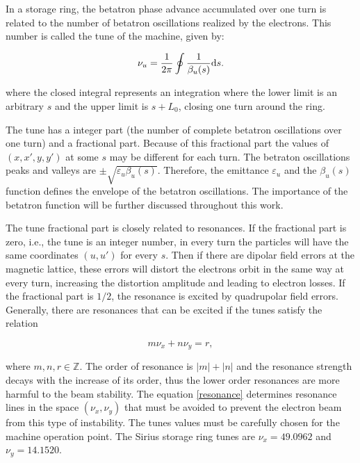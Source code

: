 In a storage ring, the betatron phase advance accumulated over one turn is related to the number of betatron oscillations realized by the electrons. This number is called the tune of the machine, given by:

\begin{equation}
    \nu_u = \dfrac{1}{2\pi} \oint \dfrac{1}{\beta_u({s})} \mathrm{d} {s}.
\end{equation}

where the closed integral represents an integration where the lower limit is an arbitrary $s$ and the upper limit is $s + L_0$, closing one turn around the ring.

The tune has a integer part (the number of complete betatron oscillations over one turn) and a fractional part. Because of this fractional part the values of $(x, x', y, y')$ at some $s$ may be different for each turn. The betraton oscillations peaks and valleys are $\pm \sqrt{\varepsilon_u \beta_u(s)}$. Therefore, the emittance $\varepsilon_u$ and the $\beta_u(s)$ function defines the envelope of the betatron oscillations. The importance of the betatron function will be further discussed throughout this work.

The tune fractional part is closely related to resonances. If the fractional part is zero, i.e., the tune is an integer number, in every turn the particles will have the same coordinates $(u, u')$ for every $s$. Then if there are dipolar field errors at the magnetic lattice, these errors will distort the electrons orbit in the same way at every turn, increasing the distortion amplitude and leading to electron losses. If the fractional part is $1/2$, the resonance is excited by quadrupolar field errors. Generally, there are resonances that can be excited if the tunes satisfy the relation

\begin{equation}
    m \nu_x + n \nu_y = r,
    \label{resonance}
\end{equation}

where $m, n, r \in \mathbb{Z}$. The order of resonance is $|m| + |n|$ and the resonance strength decays with the increase of its order, thus the lower order resonances are more harmful to the beam stability. The equation \eqref{resonance} determines resonance lines in the space $(\nu_x, \nu_y)$ that must be avoided to prevent the electron beam from this type of instability. The tunes values must be carefully chosen for the machine operation point. The Sirius storage ring tunes are $\nu_x = 49.0962$ and $\nu_y=14.1520$.


